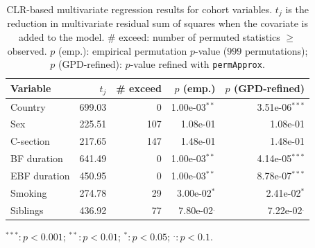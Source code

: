 \begin{table}[!h]
\centering
\caption{\label{tab:application:regression}CLR-based multivariate regression results for cohort variables. $t_j$ is the reduction in multivariate residual sum of squares when the covariate is added to the model. \# exceed: number of permuted statistics $\geq$ observed. $p$ (emp.): empirical permutation $p$-value ($999$ permutations); $p$ (GPD-refined): $p$-value refined with \texttt{permApprox}.}
\centering
\begin{threeparttable}
\begin{tabular}[t]{lrrrr}
\toprule
Variable & $t_j$ & \# exceed & $p$ (emp.) & $p$ (GPD-refined)\\
\midrule
Country & 699.03 & 0 & 1.00e-03$^{**}$ & 3.51e-06$^{***}$\\
Sex & 225.51 & 107 & 1.08e-01 & 1.08e-01\\
C-section & 217.65 & 147 & 1.48e-01 & 1.48e-01\\
BF duration & 641.49 & 0 & 1.00e-03$^{**}$ & 4.14e-05$^{***}$\\
EBF duration & 450.95 & 0 & 1.00e-03$^{**}$ & 8.78e-07$^{***}$\\
\addlinespace
Smoking & 274.78 & 29 & 3.00e-02$^{*}$ & 2.41e-02$^{*}$\\
Siblings & 436.92 & 77 & 7.80e-02$^{.}$ & 7.22e-02$^{.}$\\
\bottomrule
\end{tabular}
\begin{tablenotes}
\item $^{***}:p<0.001$; $^{**}:p<0.01$; $^{*}:p<0.05$; $^{.}:p<0.1$.
\end{tablenotes}
\end{threeparttable}
\end{table}
